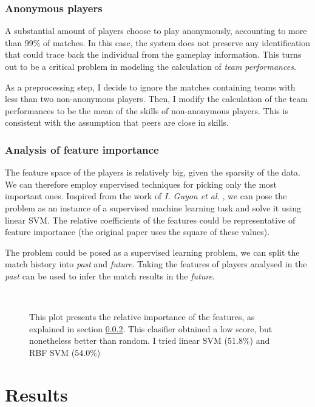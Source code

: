 \documentclass[10pt,a4]{article}
\begin{document}
\subsubsection{Anonymous players}
A substantial amount of players choose to play anonymously, accounting to 
more than 99\% of matches. In this case, the system does not preserve any 
identification that could trace back the individual from the gameplay information. 
This turns out to be a critical problem in modeling the calculation of 
\emph{team performances}.

As a preprocessing step, I decide to ignore the matches containing teams with less
than two non-anonymous players. Then, I modify the calculation of the team 
performances to be the mean of the skills of non-anonymous players. This is 
consistent with the assumption that peers are close in skills. 

\subsubsection{Analysis of feature importance}
\label{sssec:features}

The feature space of the players is relatively big, given the sparsity of the data.
We can therefore employ supervised techniques for picking only the most important ones.
Inspired from the work of \emph {I. Guyon et al.} \cite{guyon2002gene}, we can 
pose the problem as an instance of a supervised machine learning task and solve it 
using linear SVM. The relative coefficients of the features could be representative 
of feature importance (the original paper uses the square of these values).

The problem could be posed as a supervised learning problem, we can split the 
match history into \emph{past} and \emph{future}. Taking the features of players
analysed in the \emph{past} can be used to infer the match results in the \emph{future}.

\begin{figure}[h!]
  \centering
  \mbox{
  }
  \caption{
    This plot presents the relative importance of the features, as explained in 
  section \ref{sssec:features}. This clasifier obtained a 
  low score, but nonetheless better than random. I tried linear SVM (51.8\%) and 
  RBF SVM (54.0\%)
  }
  \label{fig:feature_imp}
\end{figure}

\section{Results}
\end{document}
